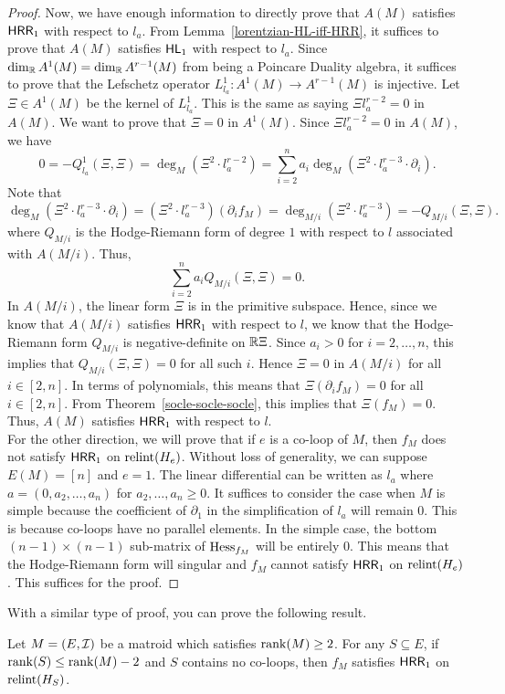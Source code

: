 \documentclass{puthesis-UG}
\begin{document}
\begin{proof}
	Now, we have enough information to directly prove that $A(M)$ satisfies $\mathsf{HRR}_1$ with respect to $l_a$. From Lemma~\ref{lorentzian-HL-iff-HRR}, it suffices to prove that $A(M)$ satisfies $\mathsf{HL}_1$ with respect to $l_a$. Since $\dim_{\mathbb{R}} A^1(M) = \dim_{\mathbb{R}} A^{r-1}(M)$ from being a Poincare Duality algebra, it suffices to prove that the Lefschetz operator $L_{l_a}^1 : A^1(M) \to A^{r-1}(M)$ is injective. Let $\Xi \in A^1(M)$ be the kernel of $L_{l_a}^1$. This is the same as saying $\Xi l_a^{r-2} = 0$ in $A(M)$. We want to prove that $\Xi = 0$ in $A^1(M)$. Since $\Xi l_a^{r-2} = 0$ in $A(M)$, we have 
	\[
		0 = -Q_{l_a}^1 (\Xi, \Xi) = \deg_M (\Xi^2 \cdot l_a^{r-2}) = \sum_{i = 2}^n a_i \deg_M (\Xi^2 \cdot l_a^{r-3} \cdot \partial_i).
	\]
	Note that 
	\[
		\deg_M (\Xi^2 \cdot l_a^{r-3} \cdot \partial_i) = (\Xi^2 \cdot l_a^{r-3}) (\partial_i f_M) = \deg_{M / i} (\Xi^2 \cdot l_a^{r-3}) = - Q_{M/i} (\Xi, \Xi).
	\]
	where $Q_{M/i}$ is the Hodge-Riemann form of degree $1$ with respect to $l$ associated with $A(M/i)$. Thus, 
	\[
		\sum_{i = 2}^n a_i Q_{M/i}(\Xi, \Xi) = 0.
	\]
	In $A(M/i)$, the linear form $\Xi$ is in the primitive subspace. Hence, since we know that $A(M/i)$ satisfies $\mathsf{HRR}_1$ with respect to $l$, we know that the Hodge-Riemann form $Q_{M/i}$ is negative-definite on $\mathbb{R} \Xi$. Since $a_i > 0$ for $i = 2, \ldots, n$, this implies that $Q_{M/i}(\Xi, \Xi) = 0$ for all such $i$. Hence $\Xi = 0$ in $A(M/i)$ for all $i \in [2, n]$. In terms of polynomials, this means that $\Xi (\partial_i f_M) = 0$ for all $i \in [2, n]$. From Theorem~\ref{socle-socle-socle}, this implies that $\Xi (f_M) = 0$. Thus, $A(M)$ satisfies $\mathsf{HRR}_1$ with respect to $l$. \\

	For the other direction, we will prove that if $e$ is a co-loop of $M$, then $f_M$ does not satisfy $\mathsf{HRR}_1$ on $\operatorname{relint} (H_e)$. Without loss of generality, we can suppose $E(M) = [n]$ and $e = 1$. The linear differential can be written as $l_a$ where $a = (0, a_2, \ldots, a_n)$ for $a_2, \ldots, a_n \geq 0$. It suffices to consider the case when $M$ is simple because the coefficient of $\partial_1$ in the simplification of $l_a$ will remain $0$. This is because co-loops have no parallel elements. In the simple case, the bottom $(n-1) \times (n-1)$ sub-matrix of $\operatorname{Hess}_{f_M}$ will be entirely $0$. This means that the Hodge-Riemann form will singular and $f_M$ cannot satisfy $\mathsf{HRR}_1$ on $\operatorname{relint} (H_e)$. This suffices for the proof. 
\end{proof}

With a similar type of proof, you can prove the following result. 
\begin{thm}
	Let $M = (E, \mathcal{I})$ be a matroid which satisfies $\operatorname{rank} (M) \geq 2$. For any $S \subseteq E$, if $\operatorname{rank}(S) \leq \operatorname{rank} (M) - 2$ and $S$ contains no co-loops, then $f_M$ satisfies $\mathsf{HRR}_1$ on $\operatorname{relint} (H_S)$. 
\end{thm}
\end{document}
